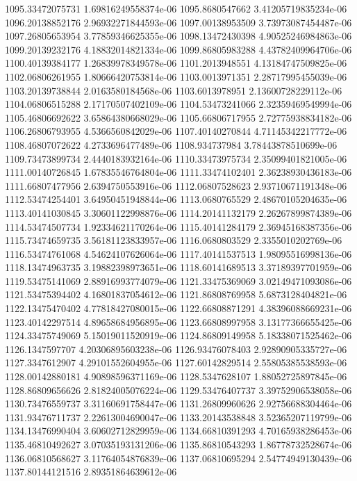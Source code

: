 {1095.33472075731 1.69816249558374e-06
1095.8680547662 3.41205719835234e-06
1096.20138852176 2.96932271844593e-06
1097.00138953509 3.73973087454487e-06
1097.26805653954 3.77859346625355e-06
1098.13472430398 4.90525246984863e-06
1099.20139232176 4.18832014821334e-06
1099.86805983288 4.43782409964706e-06
1100.40139384177 1.26839978349578e-06
1101.2013948551 4.13184747509825e-06
1102.06806261955 1.80666420753814e-06
1103.0013971351 2.28717995455039e-06
1103.20139738844 2.0163580184568e-06
1103.6013978951 2.13600728229112e-06
1104.06806515288 2.17170507402109e-06
1104.53473241066 2.32359469549994e-06
1105.46806692622 3.65864380668029e-06
1105.66806717955 2.72775938834182e-06
1106.26806793955 4.5366560842029e-06
1107.40140270844 4.71145342217772e-06
1108.46807072622 4.2733696477489e-06
1108.934737984 3.78443878510699e-06
1109.73473899734 2.4440183932164e-06
1110.33473975734 2.35099401821005e-06
1111.00140726845 1.67835546764804e-06
1111.33474102401 2.36238930436183e-06
1111.66807477956 2.6394750553916e-06
1112.06807528623 2.93710671191348e-06
1112.53474254401 3.64950451948844e-06
1113.0680765529 2.48670105204635e-06
1113.40141030845 3.30601122998876e-06
1114.20141132179 2.26267899874389e-06
1114.53474507734 1.92334621170264e-06
1115.40141284179 2.36945168387356e-06
1115.73474659735 3.56181123833957e-06
1116.0680803529 2.3355010202769e-06
1116.53474761068 4.54624107626064e-06
1117.40141537513 1.98095516998136e-06
1118.13474963735 3.19882398973651e-06
1118.60141689513 3.37189397701959e-06
1119.53475141069 2.88916993774079e-06
1121.33475369069 3.02149471093086e-06
1121.53475394402 4.16801837054612e-06
1121.86808769958 5.6873128404821e-06
1122.13475470402 4.77818427080015e-06
1122.66808871291 4.38396088669231e-06
1123.40142297514 4.89658684956895e-06
1123.66808997958 3.13177366655425e-06
1124.33475749069 5.15019011520919e-06
1124.86809149958 5.18338071525462e-06
1126.1347597707 4.20306895603238e-06
1126.93476078403 2.92890905335727e-06
1127.3347612907 4.29101552604955e-06
1127.60142829514 2.55805385538593e-06
1128.00142880181 4.90898596371169e-06
1128.5347628107 1.88052725897845e-06
1128.86809656626 2.81824005076224e-06
1129.53476407737 3.39752906538058e-06
1130.73476559737 3.31160691758447e-06
1131.26809960626 2.92756688304464e-06
1131.93476711737 2.22613004690047e-06
1133.20143538848 3.52365207119799e-06
1134.13476990404 3.60602712829959e-06
1134.66810391293 4.70165938286453e-06
1135.46810492627 3.07035193131206e-06
1135.86810543293 1.86778732528674e-06
1136.06810568627 3.11764054876839e-06
1137.06810695294 2.54774949130439e-06
1137.80144121516 2.89351864639612e-06
}
